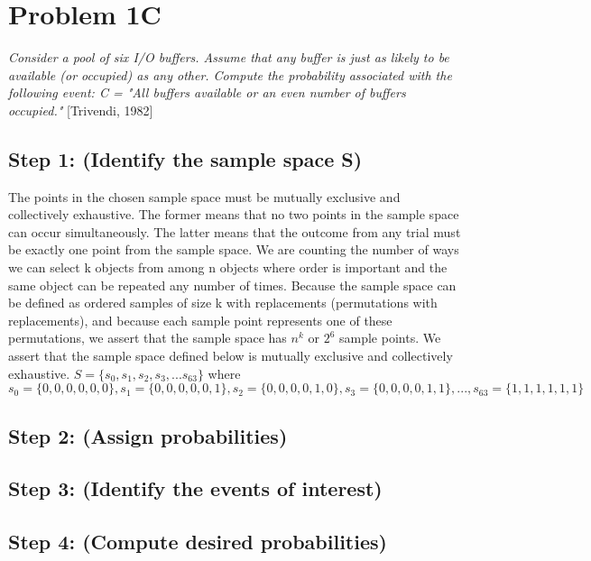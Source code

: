 \documentclass[a4paper,10pt]{article}
\title{}
\author{Mark Johnson \\
Loyola University Chicago}
\date {mjohnson4@luc.edu}
\begin{document}
\maketitle

\section{Problem 1C}
\emph{Consider a pool of six I/O buffers. Assume that any buffer is just as likely to be available (or occupied) as 
any other. Compute the probability associated with the following event: \newline
C = "All buffers available or an even number of buffers occupied."} [Trivendi, 1982]
\subsection{Step 1: (Identify the sample space S)}
The points in the chosen sample space must be mutually exclusive and collectively exhaustive. The former means that 
no two points in the sample space can occur simultaneously. The latter means that the outcome from any trial must be 
exactly one point from the sample space. We are counting the number of ways we can select k objects from among n 
objects where order is important and the same object can be repeated any number of times. Because the sample space 
can be defined as ordered samples of size k with replacements (permutations with replacements), and because each 
sample point represents one of these permutations, we assert that the sample space has $ n^{k} $ or $ 2^{6} $ sample 
points. We assert that the sample space defined below is mutually exclusive and collectively exhaustive. \newline
$ S = \{ s_{0}, s_{1}, s_{2}, s_{3},...s_{63} \} $ where \newline
$ s_{0} = \{0,0,0,0,0,0\}, s_{1} = \{0,0,0,0,0,1\}, s_{2} = \{0,0,0,0,1,0\}, s_{3} = \{0,0,0,0,1,1\},...,s_{63} = 
\{1,1,1,1,1,1\} $

\subsection{Step 2: (Assign probabilities)}


\subsection{Step 3: (Identify the events of interest)}

\subsection{Step 4: (Compute desired probabilities)}
\end{document}
